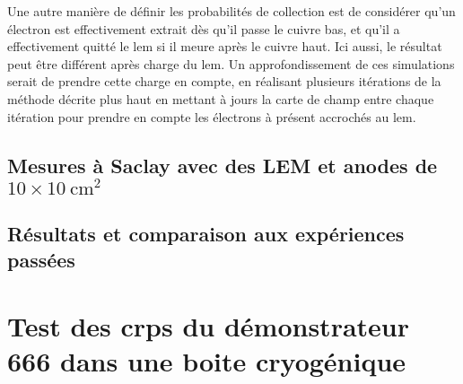             Une autre manière de définir les probabilités de collection est de considérer qu'un électron est effectivement extrait dès qu'il passe le cuivre bas, et qu'il a effectivement quitté le \gls{lem} si il meure après le cuivre haut. Ici aussi, le résultat peut être différent après charge du \gls{lem}. Un approfondissement de ces simulations serait de prendre cette charge en compte, en réalisant plusieurs itérations de la méthode décrite plus haut en mettant à jours la carte de champ entre chaque itération pour prendre en compte les électrons à présent accrochés au \gls{lem}.\\
            
            
            
        \subsection{Mesures à Saclay avec des LEM et anodes de \texorpdfstring{$10\times\SI{10}{\cm\squared}$}{10x10cm2} }
        
        \subsection{Résultats et comparaison aux expériences passées}
        
    \section{Test des \glspl{crp} du démonstrateur 666 dans une boite cryogénique}
        
